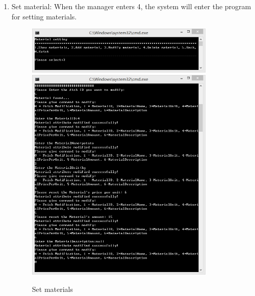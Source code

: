\documentclass{article}
\begin{document}
\begin{enumerate}
    \item Set material:\newline 
    When the manager enters 4, the system will enter the program for setting materials. 
        \begin{figure}[H]
        \centering
        \includegraphics[width=0.85\textwidth]{E/E3a.jpg}
        \includegraphics[width=0.85\textwidth]{E/E3allin.jpg}
        \caption{Set materials}
        \end{figure}
    

\end{enumerate}
\end{document}

